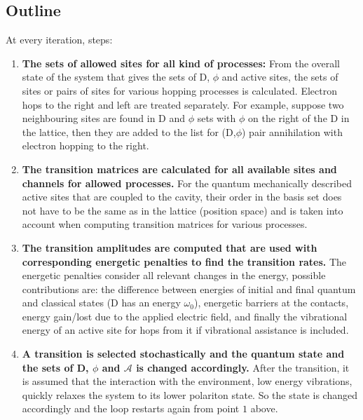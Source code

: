\documentclass[a4paper]{revtex4-1} %
\begin{document}
\subsection{Outline}

At every iteration, steps:\\
\begin{enumerate}
\item 
{\bf The sets of allowed sites for all kind of processes:}
From the overall state of the system
that gives
the sets of D, $\phi$ and active sites, 
the sets of sites or pairs of sites for various hopping processes
is calculated. Electron hops to the right and left are treated separately.
For example, suppose two neighbouring sites are found in D and $\phi$ sets
with $\phi$ on the right of the D in the lattice, 
then they are added to the list for (D,$\phi$) pair annihilation with electron hopping to the right.


\item
{\bf The transition matrices are calculated for all available sites and channels for allowed processes.}
For the quantum mechanically described active sites that are coupled to the cavity,
their order in the basis set does not have to be the same as in the lattice (position space)
and is taken into account when computing transition matrices for various processes.

\item
{\bf  The transition amplitudes are computed that are used with corresponding energetic penalties 
to find the transition rates.}
The energetic penalties consider all relevant changes in the energy, possible contributions are:
the difference between energies of initial and final quantum
and classical states (D has an energy $\omega_0$),
energetic barriers at the contacts, energy gain/lost due to the applied electric field,
and finally the vibrational energy of an active site for hops from it if vibrational assistance is included.

\item 
{\bf  A transition is selected stochastically and the quantum state and the sets of D, $\phi$ and $\mathcal{A}$ is changed accordingly.}
After the transition, it is assumed that the interaction with the environment, low energy vibrations,
quickly relaxes the system to its lower polariton state.
So the state is changed accordingly and the loop restarts again from point $1$ above.

\end{enumerate}
\end{document}
